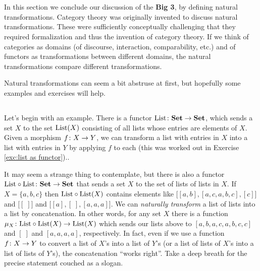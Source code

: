 \documentclass[CT4S-EN-RU]{subfiles}
\begin{document}
\section{}\label{sec:nat trans}

In this section we conclude our discussion of the {\bf Big 3}, by defining natural transformations. Category theory was originally invented to discuss natural transformations. These were sufficiently conceptually challenging that they required formalization and thus the invention of category theory. If we think of categories as domains (of discourse, interaction, comparability, etc.) and of functors as transformations between different domains, the natural transformations compare different transformations.

Natural transformations can seem a bit abstruse at first, but hopefully some examples and exercises will help.


\subsection{}

Let's begin with an example. There is a functor $\textnormal{List}\colon{\bf Set}\rightarrow{\bf Set}$, which sends a set $X$ to the set $\textnormal{List}(X)$ consisting of all lists whose entries are elements of $X$. Given a morphism $f\colon X\rightarrow Y$, we can transform a list with entries in $X$ into a list with entries in $Y$ by applying $f$ to each (this was worked out in Exercise \ref{exc:list as functor}).. 

It may seem a strange thing to contemplate, but there is also a functor $\textnormal{List}\circ\textnormal{List}\colon{\bf Set}\rightarrow{\bf Set}$ that sends a set $X$ to the set of lists of lists in $X$. If $X=\{a,b,c\}$ then $\textnormal{List}\circ\textnormal{List}(X)$ contains elements like $\big[[a,b],[a,c,a,b,c],[c]\big]$ and $\big[[\;]\big]$ and $\big[[a],[\;],[a,a,a]\big]$. We can {\em naturally transform} a list of lists into a list by concatenation. In other words, for any set $X$ there is a function $\mu_X\colon\textnormal{List}\circ\textnormal{List}(X)\rightarrow\textnormal{List}(X)$ which sends our lists above to $[a,b,a,c,a,b,c,c]$ and $[\;]$ and $[a,a,a,a]$, respectively. In fact, even if we use a function $f\colon X\rightarrow Y$ to convert a list of $X$'s into a list of $Y$'s (or a list of lists of $X$'s into a list of lists of $Y$'s), the concatenation “works right”. Take a deep breath for the precise statement couched as a slogan.
\end{document}
